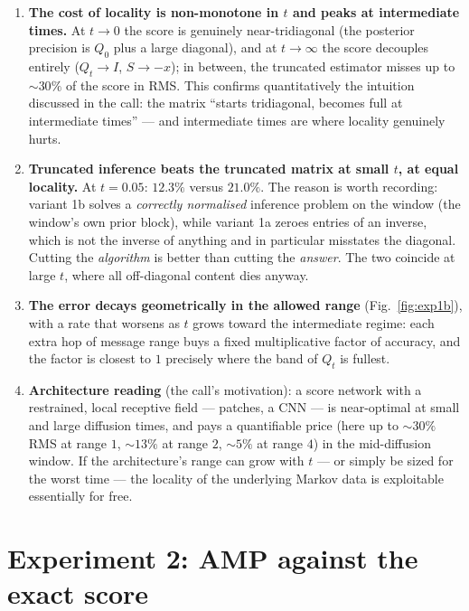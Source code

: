 \documentclass[11pt]{article}
\theoremstyle{definition}
\theoremstyle{remark}
\begin{document}
\begin{enumerate}[leftmargin=1.7em, itemsep=2pt]
\item \textbf{The cost of locality is non-monotone in $t$ and peaks at
intermediate times.} At $t\to0$ the score is genuinely near-tridiagonal
(the posterior precision is $Q_0$ plus a large diagonal), and at
$t\to\infty$ the score decouples entirely ($Q_t\to I$, $S\to-x$); in
between, the truncated estimator misses up to $\sim30\%$ of the score in
RMS. This confirms quantitatively the intuition discussed in the call: the
matrix ``starts tridiagonal, becomes full at intermediate times'' --- and
intermediate times are where locality genuinely hurts.
\item \textbf{Truncated inference beats the truncated matrix at small $t$,
at equal locality.} At $t=0.05$: $12.3\%$ versus $21.0\%$. The reason is
worth recording: variant 1b solves a \emph{correctly normalised} inference
problem on the window (the window's own prior block), while variant 1a
zeroes entries of an inverse, which is not the inverse of anything and in
particular misstates the diagonal. Cutting the \emph{algorithm} is better
than cutting the \emph{answer}. The two coincide at large $t$, where all
off-diagonal content dies anyway.
\item \textbf{The error decays geometrically in the allowed range}
(Fig.~\ref{fig:exp1b}), with a rate that worsens as $t$ grows toward the
intermediate regime: each extra hop of message range buys a fixed
multiplicative factor of accuracy, and the factor is closest to $1$
precisely where the band of $Q_t$ is fullest.
\item \textbf{Architecture reading} (the call's motivation): a score
network with a restrained, local receptive field --- patches, a CNN --- is
near-optimal at small and large diffusion times, and pays a quantifiable
price (here up to $\sim30\%$ RMS at range $1$, $\sim13\%$ at range $2$,
$\sim5\%$ at range $4$) in the mid-diffusion window. If the architecture's
range can grow with $t$ --- or simply be sized for the worst time --- the
locality of the underlying Markov data is exploitable essentially for
free.
\end{enumerate}

\section{Experiment 2: AMP against the exact score}\label{sec:exp2}
\end{document}
